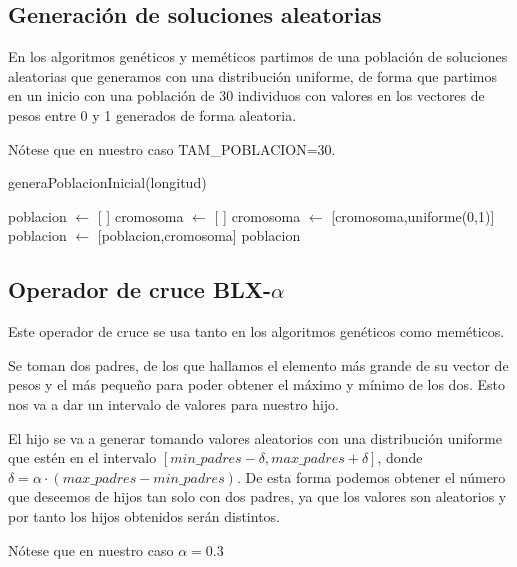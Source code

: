 \documentclass[12pt,a4paper]{article}
\begin{document}
	\subsection{Generación de soluciones aleatorias}

	En los algoritmos genéticos y meméticos partimos de una población de soluciones aleatorias que generamos con una distribución uniforme, de forma que partimos en un inicio con una población de 30 individuos con valores en los vectores de pesos entre 0 y 1 generados de forma aleatoria.

	Nótese que en nuestro caso TAM\_POBLACION=30.

	\begin{algorithm}
		\caption{generaPoblacionInicial(longitud)}
		\begin{algorithmic}
			\STATE poblacion $\leftarrow$ [ ]
				\STATE cromosoma $\leftarrow$ [ ]
					\STATE cromosoma $\leftarrow$ [cromosoma,uniforme(0,1)]
				\ENDFOR
				\STATE poblacion $\leftarrow$ [poblacion,cromosoma]
			\ENDFOR
			\RETURN poblacion
		\end{algorithmic}
	\end{algorithm}

	\subsection{Operador de cruce BLX-$\alpha$}

	Este operador de cruce se usa tanto en los algoritmos genéticos como meméticos.

	Se toman dos padres, de los que hallamos el elemento más grande de su vector de pesos y el más pequeño para poder obtener el máximo y mínimo de los dos. Esto nos va a dar un intervalo de valores para nuestro hijo.

	El hijo se va a generar tomando valores aleatorios con una distribución uniforme que estén en el intervalo $[min\_padres - \delta , max\_padres + \delta]$, donde $\delta = \alpha \cdot (max\_padres - min\_padres)$. De esta forma podemos obtener el número que deseemos de hijos tan solo con dos padres, ya que los valores son aleatorios y por tanto los hijos obtenidos serán distintos.

	Nótese que en nuestro caso $\alpha=0.3$
\end{document}
